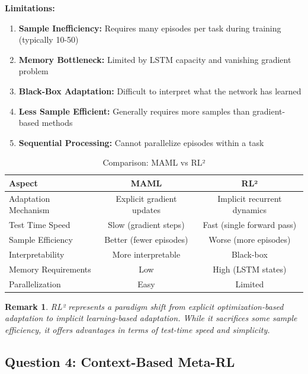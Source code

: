 \documentclass[12pt]{article}
\newcommand{\ieee}[1]{\textcolor{IEEEBlue}{\textbf{#1}}}
\newtheorem{remark}{Remark}
\begin{document}
{{			\ieee{Limitations:}
			
			\begin{enumerate}
				\item \textbf{Sample Inefficiency:} Requires many episodes per task during training (typically 10-50)
				\item \textbf{Memory Bottleneck:} Limited by LSTM capacity and vanishing gradient problem
				\item \textbf{Black-Box Adaptation:} Difficult to interpret what the network has learned
				\item \textbf{Less Sample Efficient:} Generally requires more samples than gradient-based methods
				\item \textbf{Sequential Processing:} Cannot parallelize episodes within a task
			\end{enumerate}
			
			\begin{table}[H]
			\centering
			\caption{Comparison: MAML vs RL²}
			\begin{tabular}{@{}lcc@{}}
			\toprule
			\textbf{Aspect} & \textbf{MAML} & \textbf{RL²} \\
			\midrule
			Adaptation Mechanism & Explicit gradient updates & Implicit recurrent dynamics \\
			Test Time Speed & Slow (gradient steps) & Fast (single forward pass) \\
			Sample Efficiency & Better (fewer episodes) & Worse (more episodes) \\
			Interpretability & More interpretable & Black-box \\
			Memory Requirements & Low & High (LSTM states) \\
			Parallelization & Easy & Limited \\
			\bottomrule
			\end{tabular}
			\label{tab:maml_vs_rl2}
			\end{table}
			
			\begin{remark}
			RL² represents a paradigm shift from explicit optimization-based adaptation to implicit learning-based adaptation. While it sacrifices some sample efficiency, it offers advantages in terms of test-time speed and simplicity.
			\end{remark}
			
			\subsection{Question 4: Context-Based Meta-RL}
			
}}
\end{document}
